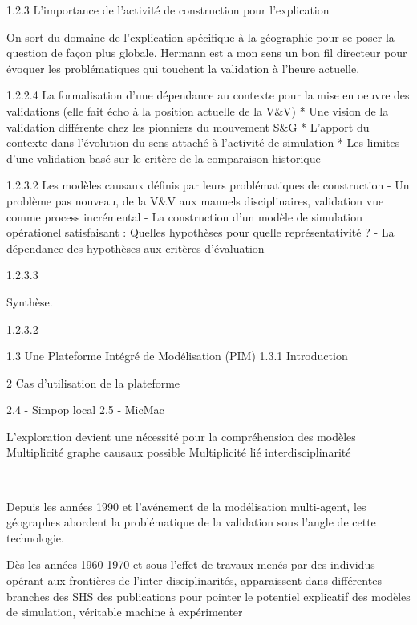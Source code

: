 	1.2.3 L'importance de l'activité de construction pour l'explication
		
		On sort du domaine de l'explication spécifique à la géographie pour se poser la question de façon plus globale. Hermann est a mon sens un bon fil directeur pour évoquer les problématiques qui touchent la validation à l'heure actuelle.

		1.2.2.4 La formalisation d'une dépendance au contexte pour la mise en oeuvre des validations
			(elle fait écho à la position actuelle de la V\&V)
			* Une vision de la validation différente chez les pionniers du mouvement S\&G
			* L'apport du contexte dans l'évolution du sens attaché à l'activité de simulation
			* Les limites d'une validation basé sur le critère de la comparaison historique

		1.2.3.2 Les modèles causaux définis par leurs problématiques de construction 
 			- Un problème pas nouveau, de la V\&V aux manuels disciplinaires, validation vue comme process incrémental
			- La construction d'un modèle de simulation opérationel satisfaisant : Quelles hypothèses pour quelle représentativité ? 
			- La dépendance des hypothèses aux critères d'évaluation

		1.2.3.3 

		Synthèse.


			1.2.3.2 
			


1.3 Une Plateforme Intégré de Modélisation (PIM)
	1.3.1 Introduction

2 Cas d'utilisation de la plateforme

	2.4 - Simpop local
	2.5 - MicMac 

L'exploration devient une nécessité pour la compréhension des modèles
	Multiplicité graphe causaux possible
	Multiplicité lié interdisciplinarité



--

Depuis les années 1990 et l'avénement de la modélisation multi-agent, les géographes abordent la problématique de la validation sous l'angle de cette technologie.

Dès les années 1960-1970 et sous l'effet de travaux menés par des individus opérant aux frontières de l'inter-disciplinarités, apparaissent dans différentes branches des SHS des publications pour pointer le potentiel explicatif des modèles de simulation, véritable machine à expérimenter 

